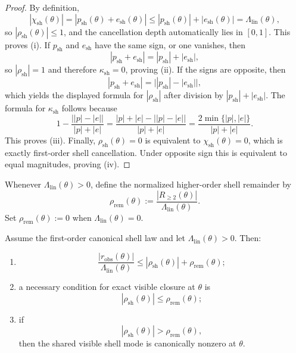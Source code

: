 \begin{proof}
By definition,
\[
  |\chi_{\mathrm{sh}}(\theta)|=|p_{\mathrm{sh}}(\theta)+e_{\mathrm{sh}}(\theta)|
  \le |p_{\mathrm{sh}}(\theta)|+|e_{\mathrm{sh}}(\theta)|
  =\Lambda_{\mathrm{lin}}(\theta),
\]
so $|\rho_{\mathrm{sh}}(\theta)|\le 1$, and the cancellation depth automatically lies in $[0,1]$. This proves (i). If $p_{\mathrm{sh}}$ and $e_{\mathrm{sh}}$ have the same sign, or one vanishes, then
\[
  |p_{\mathrm{sh}}+e_{\mathrm{sh}}|=|p_{\mathrm{sh}}|+|e_{\mathrm{sh}}|,
\]
so $|\rho_{\mathrm{sh}}|=1$ and therefore $\kappa_{\mathrm{sh}}=0$, proving (ii). If the signs are opposite, then
\[
  |p_{\mathrm{sh}}+e_{\mathrm{sh}}|=\bigl||p_{\mathrm{sh}}|-|e_{\mathrm{sh}}|\bigr|,
\]
which yields the displayed formula for $|\rho_{\mathrm{sh}}|$ after division by $|p_{\mathrm{sh}}|+|e_{\mathrm{sh}}|$. The formula for $\kappa_{\mathrm{sh}}$ follows because
\[
  1-\frac{\bigl||p|-|e|\bigr|}{|p|+|e|}=\frac{|p|+|e|-\bigl||p|-|e|\bigr|}{|p|+|e|}=\frac{2\min\{|p|,|e|\}}{|p|+|e|}.
\]
This proves (iii). Finally, $\rho_{\mathrm{sh}}(\theta)=0$ is equivalent to $\chi_{\mathrm{sh}}(\theta)=0$, which is exactly first-order shell cancellation. Under opposite sign this is equivalent to equal magnitudes, proving (iv).
\end{proof}

\begin{definition}
Whenever $\Lambda_{\mathrm{lin}}(\theta)>0$, define the normalized higher-order shell remainder by
\[
  \rho_{\mathrm{rem}}(\theta):=\frac{|R_{\ge 2}(\theta)|}{\Lambda_{\mathrm{lin}}(\theta)}.
\]
Set $\rho_{\mathrm{rem}}(\theta):=0$ when $\Lambda_{\mathrm{lin}}(\theta)=0$.
\end{definition}

\begin{corollary}
Assume the first-order canonical shell law and let $\Lambda_{\mathrm{lin}}(\theta)>0$. Then:
\begin{enumerate}[leftmargin=2em,label=(\roman*)]
\item
\[
  \frac{|r_{\mathrm{obs}}(\theta)|}{\Lambda_{\mathrm{lin}}(\theta)}
  \le |\rho_{\mathrm{sh}}(\theta)|+\rho_{\mathrm{rem}}(\theta);
\]
\item a necessary condition for exact visible closure at $\theta$ is
\[
  |\rho_{\mathrm{sh}}(\theta)|\le \rho_{\mathrm{rem}}(\theta);
\]
\item if
\[
  |\rho_{\mathrm{sh}}(\theta)|>\rho_{\mathrm{rem}}(\theta),
\]
then the shared visible shell mode is canonically nonzero at $\theta$.
\end{enumerate}
\end{corollary}

